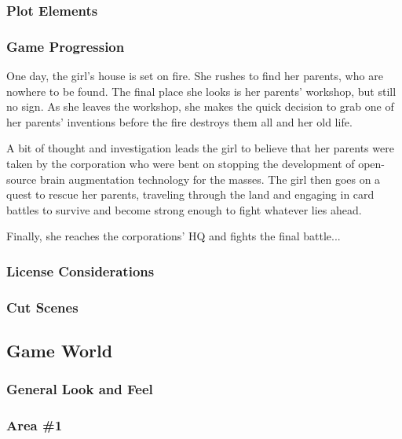 \documentclass[12pt,titlepage]{article}
\newcounter{subsubsubsection}[subsubsection]
\begin{document}
\subsubsection{Plot Elements}


\subsubsection{Game Progression}

One day, the girl's house is set on fire. She rushes to find her parents, who
are nowhere to be found. The final place she looks is her parents' workshop, but
still no sign. As she leaves the workshop, she makes the quick decision to grab
one of her parents' inventions before the fire destroys them all and her old
life.

A bit of thought and investigation leads the girl to believe that her parents
were taken by the corporation who were bent on stopping the development of
open-source brain augmentation technology for the masses. The girl then goes on
a quest to rescue her parents, traveling through the land and engaging in card
battles to survive and become strong enough to fight whatever lies ahead.

Finally, she reaches the corporations' HQ and fights the final battle...

\subsubsection{License Considerations}

\subsubsection{Cut Scenes}




\subsection{Game World}

\subsubsection{General Look and Feel}

\subsubsection{Area \#1}
\end{document}

